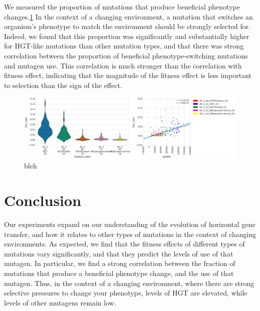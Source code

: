 \documentclass[PhD]{msu-thesis}
\begin{document}
We measured the proportion of mutations that produce beneficial phenotype changes.\ref{fig:mutagen_use_vs_fraction_beneficial} In the context of a changing environment, a mutation that switches an organism's phenotype to match the environment should be strongly selected for. Indeed, we found that this proportion was significantly and substantially higher for HGT-like mutations than other mutation types, and that there was strong correlation between the proportion of beneficial phenotype-switching mutations and mutagen use. This correlation is much stronger than the correlation with fitness effect, indicating that the magnitude of the fitness effect is less important to selection than the sign of the effect.

\begin{figure}[h!]
\begin{center}
\includegraphics[width=0.7\columnwidth]{figures/HGT/mutagen_use_vs_fraction_beneficial.png}
\caption{bleh
}\label{fig:mutagen_use_vs_fraction_beneficial}
\end{center}
\end{figure}



\section{Conclusion}
Our experiments expand on our understanding of the evolution of horizontal gene transfer, and how it relates to other types of mutations in the context of changing environments. As expected, we find that the fitness effects of different types of mutations vary significantly, and that they predict the levels of use of that mutagen. In particular, we find a strong correlation between the fraction of mutations that produce a beneficial phenotype change, and the use of that mutagen. Thus, in the context of a changing environment, where there are strong selective pressures to change your phenotype, levels of HGT are elevated, while levels of other mutagens remain low.
\end{document}
